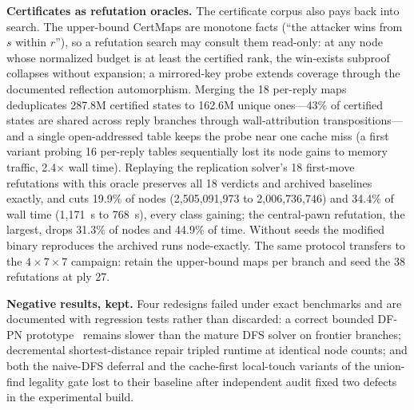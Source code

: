 \documentclass[conference]{IEEEtran}
\newcommand{\varSpec}[3]{$#1{\times}#2{\times}#3$}
\begin{document}
\textbf{Certificates as refutation oracles.} The certificate corpus also pays back into search. The upper-bound CertMaps are monotone facts (``the attacker wins from $s$ within $r$''), so a refutation search may consult them read-only: at any node whose normalized budget is at least the certified rank, the win-exists subproof collapses without expansion; a mirrored-key probe extends coverage through the documented reflection automorphism. Merging the 18 per-reply maps deduplicates 287.8M certified states to 162.6M unique ones---43\% of certified states are shared across reply branches through wall-attribution transpositions---and a single open-addressed table keeps the probe near one cache miss (a first variant probing 16 per-reply tables sequentially lost its node gains to memory traffic, 2.4$\times$ wall time). Replaying the replication solver's 18 first-move refutations with this oracle preserves all 18 verdicts and archived baselines exactly, and cuts 19.9\% of nodes (2{,}505{,}091{,}973 to 2{,}006{,}736{,}746) and 34.4\% of wall time (1{,}171~s to 768~s), every class gaining; the central-pawn refutation, the largest, drops 31.3\% of nodes and 44.9\% of time. Without seeds the modified binary reproduces the archived runs node-exactly. The same protocol transfers to the \varSpec{4}{7}{7} campaign: retain the upper-bound maps per branch and seed the 38 refutations at ply 27.

\textbf{Negative results, kept.} Four redesigns failed under exact benchmarks and are documented with regression tests rather than discarded: a correct bounded DF-PN prototype~\cite{allis1994proof,nagai2002dfpn} remains slower than the mature DFS solver on frontier branches; decremental shortest-distance repair tripled runtime at identical node counts; and both the naive-DFS deferral and the cache-first local-touch variants of the union-find legality gate lost to their baseline after independent audit fixed two defects in the experimental build.
\end{document}
